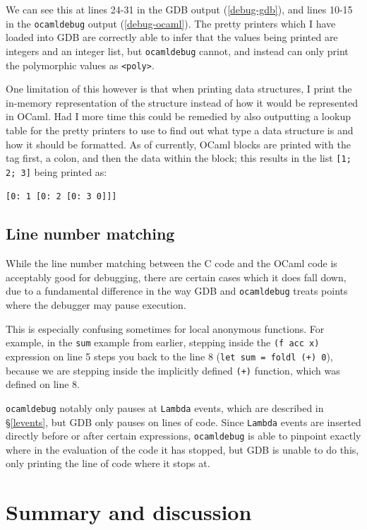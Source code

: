 We can see this at lines 24-31 in the GDB output (\ref{debug-gdb}), and 
lines 10-15 in the \texttt{ocamldebug} output (\ref{debug-ocaml}). The 
pretty printers which I have loaded into GDB are correctly able to infer that 
the values being printed are integers and an integer list, but 
\texttt{ocamldebug} cannot, and instead can only print the polymorphic values 
as \texttt{<poly>}.

One limitation of this however is that when printing data structures, I print 
the in-memory representation of the structure instead of how it would be 
represented in OCaml. Had I more time this could be remedied by also outputting 
a lookup table for the pretty printers to use to find out what type a data 
structure is and how it should be formatted. As of currently, OCaml blocks are 
printed with the tag first, a colon, and then the data within the block; this 
results in the list \texttt{[1; 2; 3]} being printed as: 

\verb|[0: 1 [0: 2 [0: 3 0]]]|

\subsection{Line number matching}

While the line number matching between the C code and the OCaml code is 
acceptably good for debugging, there are certain cases which it does fall down, 
due to a fundamental difference in the way GDB and \texttt{ocamldebug} treats 
points where the debugger may pause execution.

This is especially confusing sometimes for local anonymous functions. For
example, in the \texttt{sum} example from earlier, stepping inside the
\texttt{(f acc x)} expression on line 5 steps you back to the line 8
(\texttt{let sum = foldl (+) 0}), because we are stepping inside the implicitly
defined \texttt{(+)} function, which was defined on line 8.

\texttt{ocamldebug} notably only pauses at \texttt{Lambda} events, which are
described in \S\ref{levents}, but GDB only pauses on lines of code. Since
\texttt{Lambda} events are inserted directly before or after certain
expressions, \texttt{ocamldebug} is able to pinpoint exactly where in the
evaluation of the code it has stopped, but GDB is unable to do this, only
printing the line of code where it stops at.

\section{Summary and discussion}

